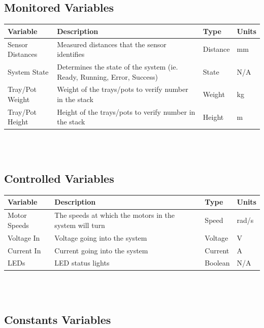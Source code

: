 \documentclass[12pt, titlepage]{article}
\begin{document}

\subsection{Monitored Variables}

\begin{tabular}{ |p{3cm}|p{9cm}|p{2cm}|p{1cm}| }
  \hline
  Variable & Description & Type & Units\\
  \hline
  Sensor Distances & Measured distances that the sensor identifies
   & Distance & mm\\
  \hline
  System State & Determines the state of the system (ie. Ready, Running, Error, Success)
   & State &  N/A\\
  \hline
  Tray/Pot Weight & Weight of the trays/pots to verify number in the stack
   & Weight & kg\\
  \hline
  Tray/Pot Height & Height of the trays/pots to verify number in the stack
   & Height & m\\
  
  \hline
 \end{tabular}\\\\

\subsection{Controlled Variables}

\begin{tabular}{ |p{3cm}|p{9cm}|p{2cm}|p{1cm}| }
  \hline
  Variable & Description & Type & Units\\
  \hline
  Motor Speeds & The speeds at which the motors in the system will turn
   & Speed & rad/s\\
  \hline
  Voltage In & Voltage going into the system
   & Voltage & V\\
  \hline
  Current In & Current going into the system
   & Current &  A\\
  \hline
  LEDs & LED status lights
   & Boolean & N/A\\
  
  \hline
 \end{tabular}\\\\

\subsection{Constants Variables}
\end{document}
